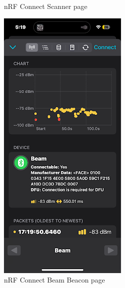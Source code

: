 \begin{figure}[H]
\begin{minipage}{0.32\textwidth}
		\caption{nRF Connect Scanner page}
		\label{fig:nrfconnect1}
	\end{minipage}
	\hfill
	\begin{minipage}{0.32\textwidth}
		\centering
		\includegraphics[width=0.8\linewidth]{nrfconnect2}
		\caption{nRF Connect Beam Beacon page}
		\label{fig:nrfconnect2}
	\end{minipage}
	\hfill
	\begin{minipage}{0.32\textwidth}
		\centering

\end{minipage}
\end{figure}
